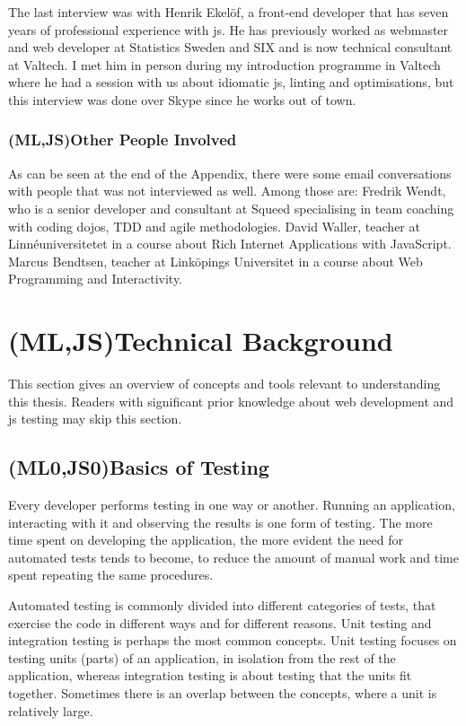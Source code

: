 \documentclass[11pt]{article}
\begin{document}
The last interview was with Henrik Ekelöf, a front-end developer that has seven years of professional experience with \gls{js}. He has previously worked as webmaster and web developer at Statistics Sweden and SIX and is now technical consultant at Valtech. I met him in person during my introduction programme in Valtech where he had a session with us about idiomatic \gls{js}, linting and optimisations, but this interview was done over Skype since he works out of town.

\subsubsection{(ML,JS)Other People Involved}

As can be seen at the end of the Appendix, there were some email conversations with people that was not interviewed as well. Among those are: Fredrik Wendt, who is a senior developer and consultant at Squeed specialising in team coaching with coding dojos, TDD and agile methodologies. David Waller, teacher at Linnéuniversitetet in a course about Rich Internet Applications with JavaScript. Marcus Bendtsen, teacher at Linköpings Universitet in a course about Web Programming and Interactivity.


\section{(ML,JS)Technical Background}

This section gives an overview of concepts and tools relevant to understanding this thesis. Readers with significant prior knowledge about web development and \gls{js} testing may skip this section.

\subsection{(ML0,JS0)Basics of Testing}

Every developer performs testing in one way or another. Running an application, interacting with it and observing the results is one form of testing. The more time spent on developing the application, the more evident the need for automated tests tends to become, to reduce the amount of manual work and time spent repeating the same procedures.

Automated testing is commonly divided into different categories of tests, that exercise the code in different ways and for different reasons. Unit testing and integration testing is perhaps the most common concepts. Unit testing focuses on testing units (parts) of an application, in isolation from the rest of the application, whereas integration testing is about testing that the units fit together. Sometimes there is an overlap between the concepts, where a unit is relatively large.
\end{document}
